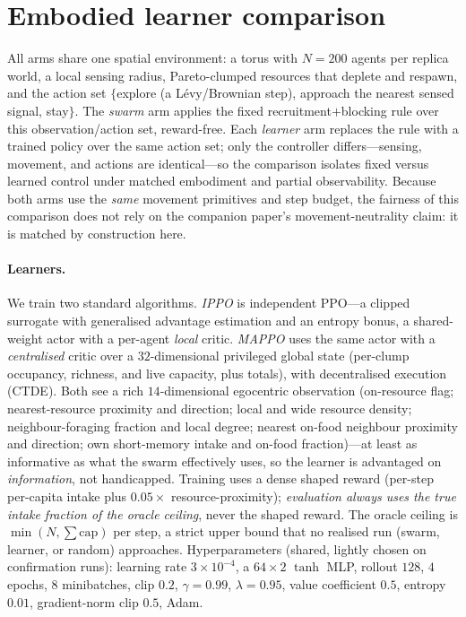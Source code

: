 \documentclass{article}
\begin{document}
\section{Embodied learner comparison}
\label{app:embodied}
All arms share one spatial environment: a torus with $N=200$ agents per replica world, a local sensing radius,
Pareto-clumped resources that deplete and respawn, and the action set $\{$explore (a L\'evy/Brownian step),
approach the nearest sensed signal, stay$\}$. The \emph{swarm} arm applies the fixed recruitment$+$blocking
rule over this observation/action set, reward-free. Each \emph{learner} arm replaces the rule with a trained
policy over the same action set; only the controller differs---sensing, movement, and actions are
identical---so the comparison isolates fixed versus learned control under matched embodiment and partial
observability. Because both arms use the \emph{same} movement primitives and step budget, the fairness of this
comparison does not rely on the companion paper's movement-neutrality claim: it is matched by construction here.

\paragraph{Learners.} We train two standard algorithms. \emph{IPPO} is independent PPO---a clipped surrogate
with generalised advantage estimation and an entropy bonus, a shared-weight actor with a per-agent
\emph{local} critic. \emph{MAPPO} uses the same actor with a \emph{centralised} critic over a $32$-dimensional
privileged global state (per-clump occupancy, richness, and live capacity, plus totals), with decentralised
execution (CTDE). Both see a rich $14$-dimensional egocentric observation (on-resource flag; nearest-resource
proximity and direction; local and wide resource density; neighbour-foraging fraction and local degree;
nearest on-food neighbour proximity and direction; own short-memory intake and on-food fraction)---at least as
informative as what the swarm effectively uses, so the learner is advantaged on \emph{information}, not
handicapped. Training uses a dense shaped reward (per-step per-capita intake plus $0.05\times$
resource-proximity); \emph{evaluation always uses the true intake fraction of the oracle ceiling}, never the
shaped reward. The oracle ceiling is $\min(N,\sum\text{cap})$ per step, a strict upper bound that no realised
run (swarm, learner, or random) approaches.
Hyperparameters (shared, lightly chosen on confirmation runs): learning rate $3\times10^{-4}$, a $64\times2$
$\tanh$ MLP, rollout $128$, $4$ epochs, $8$ minibatches, clip $0.2$, $\gamma=0.99$, $\lambda=0.95$, value
coefficient $0.5$, entropy $0.01$, gradient-norm clip $0.5$, Adam.
\end{document}
